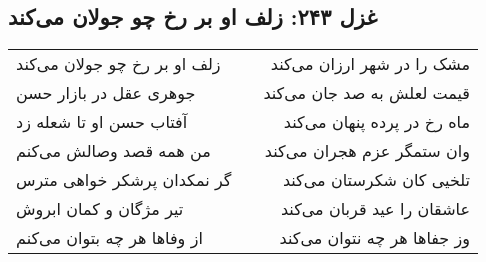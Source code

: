 \begin{center}
\section*{غزل ۲۴۳: زلف او بر رخ چو جولان می‌کند}
\label{sec:243}
\begin{longtable}{l p{0.5cm} r}
زلف او بر رخ چو جولان می‌کند
&&
مشک را در شهر ارزان می‌کند
\\
جوهری عقل در بازار حسن
&&
قیمت لعلش به صد جان می‌کند
\\
آفتاب حسن او تا شعله زد
&&
ماه رخ در پرده پنهان می‌کند
\\
من همه قصد وصالش می‌کنم
&&
وان ستمگر عزم هجران می‌کند
\\
گر نمکدان پرشکر خواهی مترس
&&
تلخیی کان شکرستان می‌کند
\\
تیر مژگان و کمان ابروش
&&
عاشقان را عید قربان می‌کند
\\
از وفاها هر چه بتوان می‌کنم
&&
وز جفاها هر چه نتوان می‌کند
\\
\end{longtable}
\end{center}
